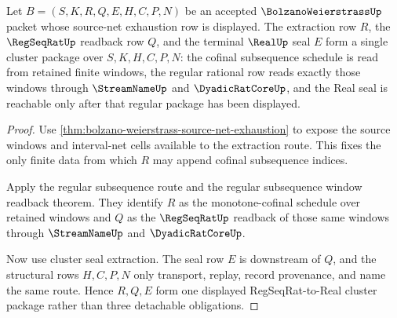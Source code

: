 \begin{theorem}
\label{thm:bolzano-weierstrass-regseqrat-cluster-package}
Let $B=(S,K,R,Q,E,H,C,P,N)$ be an accepted $\BolzanoWeierstrassUp$ packet whose source-net exhaustion row is displayed. The extraction row $R$, the $\RegSeqRatUp$ readback row $Q$, and the terminal $\RealUp$ seal $E$ form a single cluster package over $S,K,H,C,P,N$: the cofinal subsequence schedule is read from retained finite windows, the regular rational row reads exactly those windows through $\StreamNameUp$ and $\DyadicRatCoreUp$, and the Real seal is reachable only after that regular package has been displayed.
\end{theorem}
\begin{proof}
Use \autoref{thm:bolzano-weierstrass-source-net-exhaustion} to expose the source windows and interval-net cells available to the extraction route. This fixes the only finite data from which $R$ may append cofinal subsequence indices.

Apply the regular subsequence route and the regular subsequence window readback theorem. They identify $R$ as the monotone-cofinal schedule over retained windows and $Q$ as the $\RegSeqRatUp$ readback of those same windows through $\StreamNameUp$ and $\DyadicRatCoreUp$.

Now use cluster seal extraction. The seal row $E$ is downstream of $Q$, and the structural rows $H,C,P,N$ only transport, replay, record provenance, and name the same route. Hence $R,Q,E$ form one displayed RegSeqRat-to-Real cluster package rather than three detachable obligations.
\end{proof}

